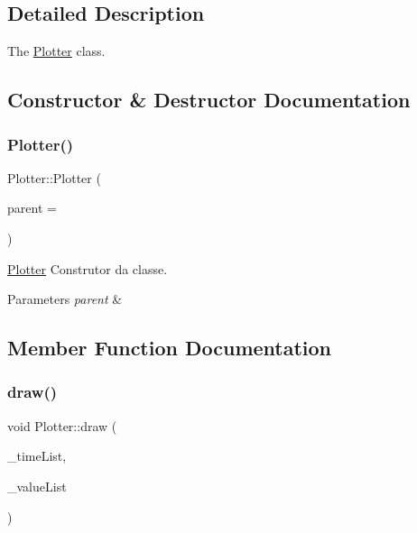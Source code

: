 \subsection{Detailed Description}
The \mbox{\hyperlink{class_plotter}{Plotter}} class. 

\subsection{Constructor \& Destructor Documentation}
\mbox{\label{class_plotter_a367b6890c36910a27ec710ac3693e64b}} 
\subsubsection{\texorpdfstring{Plotter()}{Plotter()}}
{\footnotesize\ttfamily Plotter\+::\+Plotter (\begin{DoxyParamCaption}\item[{Q\+Widget $\ast$}]{parent = {} }\end{DoxyParamCaption})\hspace{0.3cm}{\ttfamily [explicit]}}



\mbox{\hyperlink{class_plotter}{Plotter}} Construtor da classe. 


\begin{DoxyParams}{Parameters}
{\em parent} & \\
\hline
\end{DoxyParams}


\subsection{Member Function Documentation}
\mbox{\label{class_plotter_abeafad6e6d4ffae03d5e50dbf85e83f6}} 
\subsubsection{\texorpdfstring{draw()}{draw()}}
{\footnotesize\ttfamily void Plotter\+::draw (\begin{DoxyParamCaption}\item[{std\+::vector$<$ qint64 $>$}]{\+\_\+time\+List,  }\item[{std\+::vector$<$ int $>$}]{\+\_\+value\+List }\end{DoxyParamCaption})}



